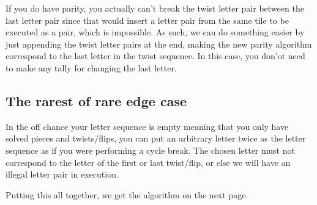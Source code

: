 \documentclass{article}
\begin{document}
If you do have parity, you actually can't break the twist letter pair between the last letter pair since that would insert a letter pair from the same tile to be executed as a pair, which is impossible. As such, we can do something easier by just appending the twist letter pairs at the end, making the new parity algorithm correspond to the last letter in the twist sequence. In this case, you don'ot need to make any tally for changing the last letter.

\subsection{The rarest of rare edge case}

In the off chance your letter sequence is empty meaning that you only have solved pieces and twists/flips, you can put an arbitrary letter twice as the letter sequence as if you were performing a cycle break. The chosen letter must not correspond to the letter of the first or last twist/flip, or else we will have an illegal letter pair in execution.

Putting this all together, we get the algorithm on the next page.
\end{document}
